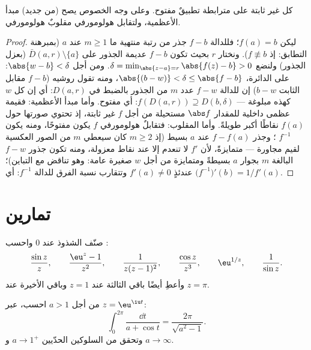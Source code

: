 \begin{corollary}
\label{cor:b3:residues:openmapping}
كل  غير ثابتة على  مترابطة تطبيقٌ
مفتوح. وعلى وجه الخصوص يصح (من جديد) مبدأ الأعظمية، ولتقابل
هولومورفي مقلوبٌ هولومورفي.
\end{corollary}

\begin{proof}
ليكن $f(a) = b$؛ فللدالة $f - b$ جذر من رتبة منتهية ما $m
\geq 1$
عند $a$ (بمبرهنة التطابق: إذ $f \not\equiv b$). ونختار $r$ بحيث
تكون $f - b$ عديمة الجذور على $\bar D(a, r)\setminus\{a\}$ (بعزل الجذور) ولنضع
$\delta = \min_{\abs{z - a} =
r}\abs{f(z) - b} > 0$. ومن أجل $\abs{w - b} < \delta$: على الدائرة، $\abs{(b - w)} < \delta \leq \abs{f - b}$، ومنه تقول روشيه
($f - b$ مقابل الثابت $b - w$) إن للدالة $f - w$ عدد $m$ من الجذور
بالضبط في $D(a, r)$: أي إن كل $w$ كهذه مبلوغة --- $f(D(a,r)) \supseteq D(b, \delta)$: أي
مفتوح. وأما مبدأ الأعظمية: فقيمة عظمى داخلية للمقدار $\abs f$
مستحيلة من أجل $f$ غير ثابتة، إذ تحتوي صورتها حول $f(a)$ نقاطًا
أكبر طويلةً. وأما المقلوب: فتقابلٌ هولومورفي $f$ يكون مفتوحًا،
ومنه يكون $f^{-1}$ ؛ وجذر $f - f(a)$ عند $a$ بسيط (إذ
$m \geq 2$ كان سيعطي $m$ من الصور العكسية لقيم مجاورة ---
متمايزةً، لأن $f'$ لا تنعدم إلا عند نقاط معزولة، ومنه تكون
جذور $f - w$ البالغة $m$ بجوار $a$ بسيطةً ومتمايزة من أجل $w$ صغيرة
عامة: وهو تناقض مع التباين)؛ عندئذٍ $f'(a) \neq 0$ وتتقارب
نسبة الفرق للدالة $f^{-1}$: أي $\bigl(f^{-1}\bigr)'(b) =
1/f'(a)$.
\end{proof}

\section{تمارين}

\begin{exercise}[$\star$]\label{exo:b3:residues:1}
صنّف الشذوذ عند $0$ واحسب :
\[
\frac{\sin z}{z},\qquad
\frac{\eu^z - 1}{z^2},\qquad
\frac{1}{z(z-1)^2},\qquad
\frac{\cos z}{z^3},\qquad
\eu^{1/z},\qquad
\frac1{\sin z} .
\]
وأعطِ أيضًا باقي الثالثة عند $z = 1$ وباقي الأخيرة عند
$z = \pi$.
\end{exercise}

\begin{exercise}[$\star$]\label{exo:b3:residues:2}
من أجل $a > 1$ احسب، عبر $z = \eu^{\iu t}$:
\[
\int_0^{2\pi}\frac{\dd t}{a + \cos t}
= \frac{2\pi}{\sqrt{a^2 - 1}} .
\]
وتحقق من السلوكين الحدّيين $a \to 1^+$ و $a \to \infty$.
\end{exercise}

